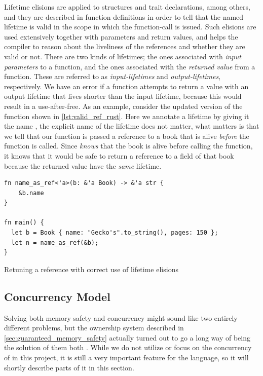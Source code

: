 Lifetime elisions are applied to structures and trait declarations, among others, and they are described in function definitions in order to tell \rust that the named lifetime is valid in the scope in which the function-call is issued.
Such elisions are used extensively together with parameters and return values, and helps the compiler to reason about the liveliness of the references and whether they are valid or not.
There are two kinds of lifetimes; the ones associated with \emph{input parameters} to a function, and the ones associated with the \emph{returned value} from a function.
These are referred to as \emph{input-lifetimes} and \emph{output-lifetimes}, respectively.
We have an error if a function attempts to return a value with an output lifetime that lives shorter than the input lifetime, because this would result in a use-after-free.
As an example, consider the updated version of the  function shown in \autoref{lst:valid_ref_rust}.
Here we annotate a lifetime by giving it the name , the explicit name of the lifetime does not matter, what matters is that we tell \rust that our function is passed a reference to a book that is alive \emph{before} the function is called.
Since \rust \emph{knows} that the book is alive before calling the function, it knows that it would be safe to return a reference to a field of that book because the returned value have the \emph{same} lifetime.

\begin{listing}[tb]
\begin{verbatim}
fn name_as_ref<'a>(b: &'a Book) -> &'a str {
    &b.name
}

fn main() {
  let b = Book { name: "Gecko's".to_string(), pages: 150 };
  let n = name_as_ref(&b);
}
\end{verbatim}
\caption{Retuning a reference with correct use of lifetime elisions}
\label{lst:valid_ref_rust}
\end{listing}

\subsection{Concurrency Model} %
\label{ssub:concurrency_model}

Solving both memory safety and concurrency might sound like two entirely different problems, but the ownership system described in \autoref{sec:guaranteed_memory_safety} actually turned out to go a long way of being the solution of them both \cite{web:fearless_concurrency_with_rust}.
While we do not utilize or focus on the concurrency of \rust in this project, it is still a very important feature for the language, so it will shortly describe parts of it in this section.

